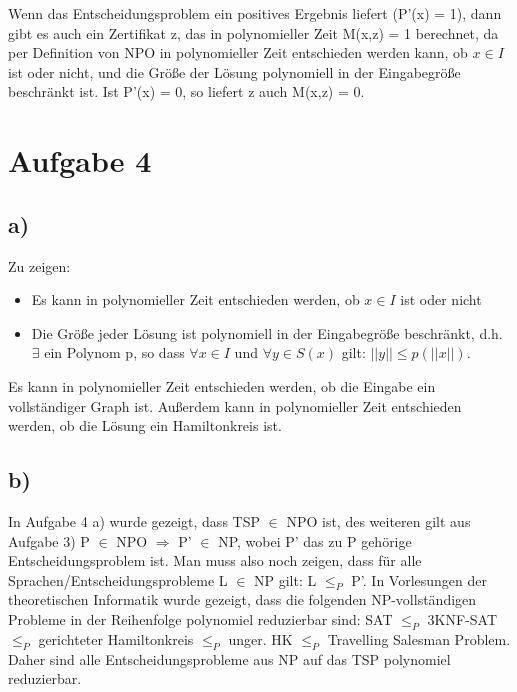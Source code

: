 \documentclass[a4paper,10pt,oneside,leqno]{scrartcl}
\begin{document}
Wenn das Entscheidungsproblem ein positives Ergebnis liefert (P'(x) = 1), dann gibt es auch ein Zertifikat z, das in polynomieller Zeit M(x,z) = 1
berechnet, da per Definition von NPO in polynomieller Zeit entschieden werden kann, ob $x \in I$ ist oder nicht, und die Größe der Lösung
polynomiell in der Eingabegröße beschränkt ist. Ist P'(x) = 0, so liefert z auch M(x,z) = 0.
\section*{Aufgabe 4}%
\subsection*{a)}
Zu zeigen: \begin{itemize}
            \item  Es kann in polynomieller Zeit entschieden werden, ob $x \in I$ ist oder nicht%
	    \item Die Größe jeder Lösung ist polynomiell in der Eingabegröße beschränkt, d.h. $\exists$ ein Polynom p, so dass $\forall x \in I$
	    und $\forall y \in S(x)$ gilt: $||y|| \leq p(||x||)$.
           \end{itemize}
Es kann in polynomieller Zeit entschieden werden, ob die Eingabe ein vollständiger Graph ist. Außerdem kann in polynomieller Zeit entschieden werden,
ob die Lösung ein Hamiltonkreis ist.

\subsection*{b)}
In Aufgabe 4 a) wurde gezeigt, dass TSP $\in$ NPO ist, des weiteren gilt aus Aufgabe 3) P $\in$ NPO $\Rightarrow$ P' $\in$ NP, wobei P' das zu P gehörige Entscheidungsproblem ist.
Man muss also noch zeigen, dass für alle Sprachen/Entscheidungsprobleme L $\in$ NP gilt: L $\leq_P$ P'.
In Vorlesungen der theoretischen Informatik wurde gezeigt, dass die folgenden NP-vollständigen Probleme in der Reihenfolge polynomiel reduzierbar sind: SAT $\leq_P$ 3KNF-SAT
$\leq_P$ gerichteter Hamiltonkreis $\leq_P$ unger. HK $\leq_P$ Travelling Salesman Problem. Daher sind alle Entscheidungsprobleme aus NP auf das TSP polynomiel reduzierbar.
\end{document}
